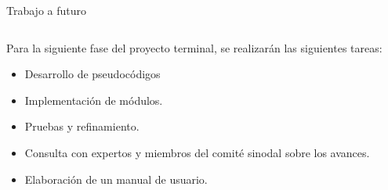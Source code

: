 \begin{frame}{Trabajo a futuro}
\begin{columns}
\begin{column}{0.6\textwidth}
            Para la siguiente fase del proyecto terminal, se realizarán las siguientes tareas:
            \begin{itemize}
                \item Desarrollo de pseudocódigos
                \item Implementación de módulos.
                \item Pruebas y refinamiento.
                \item Consulta con expertos y miembros del comité sinodal sobre los avances.
                \item Elaboración de un manual de usuario.
            \end{itemize}
        \end{column}
    \end{columns}
\end{frame}